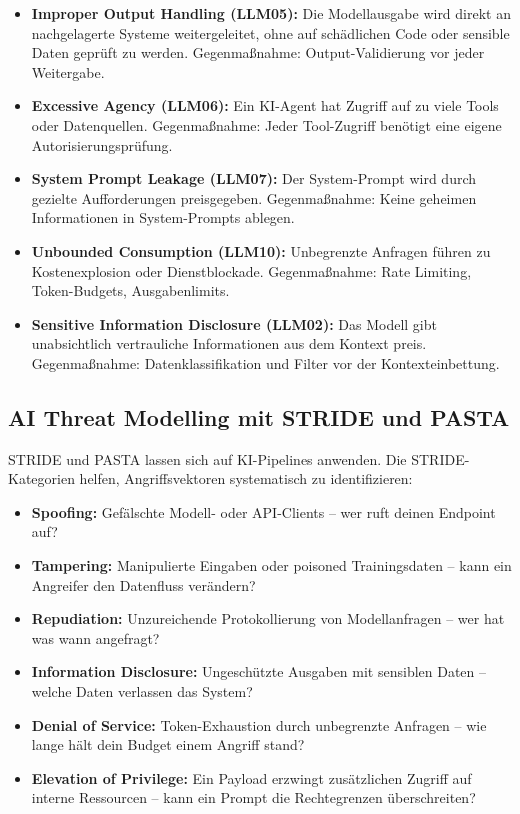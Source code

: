 \begin{itemize}[leftmargin=*]
    \item \textbf{Improper Output Handling (LLM05):} Die Modellausgabe wird direkt an nachgelagerte Systeme weitergeleitet, ohne auf schädlichen Code oder sensible Daten geprüft zu werden. Gegenmaßnahme: Output-Validierung vor jeder Weitergabe.
    \item \textbf{Excessive Agency (LLM06):} Ein KI-Agent hat Zugriff auf zu viele Tools oder Datenquellen. Gegenmaßnahme: Jeder Tool-Zugriff benötigt eine eigene Autorisierungsprüfung.
    \item \textbf{System Prompt Leakage (LLM07):} Der System-Prompt wird durch gezielte Aufforderungen preisgegeben. Gegenmaßnahme: Keine geheimen Informationen in System-Prompts ablegen.
    \item \textbf{Unbounded Consumption (LLM10):} Unbegrenzte Anfragen führen zu Kostenexplosion oder Dienstblockade. Gegenmaßnahme: Rate Limiting, Token-Budgets, Ausgabenlimits.
    \item \textbf{Sensitive Information Disclosure (LLM02):} Das Modell gibt unabsichtlich vertrauliche Informationen aus dem Kontext preis. Gegenmaßnahme: Datenklassifikation und Filter vor der Kontexteinbettung.
\end{itemize}

\subsection{AI Threat Modelling mit STRIDE und PASTA}

STRIDE und PASTA lassen sich auf KI-Pipelines anwenden. Die STRIDE-Kategorien helfen, Angriffsvektoren systematisch zu identifizieren:

\begin{itemize}[leftmargin=*]
    \item \textbf{Spoofing:} Gefälschte Modell- oder API-Clients -- wer ruft deinen Endpoint auf?
    \item \textbf{Tampering:} Manipulierte Eingaben oder poisoned Trainingsdaten -- kann ein Angreifer den Datenfluss verändern?
    \item \textbf{Repudiation:} Unzureichende Protokollierung von Modellanfragen -- wer hat was wann angefragt?
    \item \textbf{Information Disclosure:} Ungeschützte Ausgaben mit sensiblen Daten -- welche Daten verlassen das System?
    \item \textbf{Denial of Service:} Token-Exhaustion durch unbegrenzte Anfragen -- wie lange hält dein Budget einem Angriff stand?
    \item \textbf{Elevation of Privilege:} Ein Payload erzwingt zusätzlichen Zugriff auf interne Ressourcen -- kann ein Prompt die Rechtegrenzen überschreiten?
\end{itemize}

